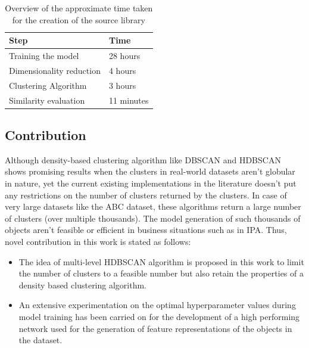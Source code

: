 \begin{table}[ht]
  \caption{Overview of the approximate time taken for the creation of the source library}
  \label{tab:overview_time}
  \centering
  \begin{tabular}{|l|l|}
    \toprule
    Step & Time \\
    \midrule
    Training the model & 28 hours\\
    Dimensionality reduction & 4 hours \\        
    Clustering Algorithm & 3 hours \\
    Similarity evaluation & 11 minutes\\
    \bottomrule
  \end{tabular}
\end{table}
\subsection{Contribution}
Although density-based clustering algorithm like \ac{DBSCAN} and \ac{HDBSCAN} shows promising results when the clusters in real-world datasets aren't globular in nature, yet the current existing implementations in the literature doesn't put any restrictions on the number of clusters returned by the clusters. In case of very large datasets like the ABC dataset\cite{Koch_2019_CVPR}, these algorithms return a large number of clusters (over multiple thousands). The model generation of such thousands of objects aren't feasible or efficient in business situations such as in \ac{IPA}. Thus, novel contribution in this work is stated as follows:
\begin{itemize}
  \item The idea of multi-level \ac{HDBSCAN} algorithm is proposed in this work to limit the number of clusters to a feasible number but also retain the properties of a density based clustering algorithm.
  \item An extensive experimentation on the optimal hyperparameter values during model training has been carried on for the development of a high performing network used for the generation of feature representations of the objects in the dataset.
\end{itemize}
\cleardoublepage